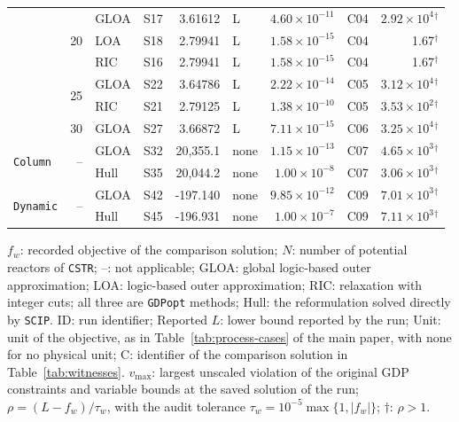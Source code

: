\begin{table}[htbp]
\begin{threeparttable}
\begin{tabular}{@{}lrllrlrlr@{}}
\addlinespace[2pt]
 & \multirow{3}{*}{20} & GLOA & S17 & 3.61612 & L & \(4.60\times10^{-11}\) & C04 & \(2.92\times10^{4}\)\(^{\dagger}\) \\
 & & LOA & S18 & 2.79941 & L & \(1.58\times10^{-15}\) & C04 & 1.67\(^{\dagger}\) \\
 & & RIC & S16 & 2.79941 & L & \(1.58\times10^{-15}\) & C04 & 1.67\(^{\dagger}\) \\
\addlinespace[2pt]
 & \multirow{2}{*}{25} & GLOA & S22 & 3.64786 & L & \(2.22\times10^{-14}\) & C05 & \(3.12\times10^{4}\)\(^{\dagger}\) \\
 & & RIC & S21 & 2.79125 & L & \(1.38\times10^{-10}\) & C05 & \(3.53\times10^{2}\)\(^{\dagger}\) \\
\addlinespace[2pt]
 & 30 & GLOA & S27 & 3.66872 & L & \(7.11\times10^{-15}\) & C06 & \(3.25\times10^{4}\)\(^{\dagger}\) \\
\midrule
\multirow{2}{*}{\texttt{Column}} & \multirow{2}{*}{--} & GLOA & S32 & 20{,}355.1 & none & \(1.15\times10^{-13}\) & C07 & \(4.65\times10^{3}\)\(^{\dagger}\) \\
 & & Hull & S35 & 20{,}044.2 & none & \(1.00\times10^{-8}\) & C07 & \(3.06\times10^{3}\)\(^{\dagger}\) \\
\midrule
\multirow{2}{*}{\texttt{Dynamic}} & \multirow{2}{*}{--} & GLOA & S42 & -197.140 & none & \(9.85\times10^{-12}\) & C09 & \(7.01\times10^{3}\)\(^{\dagger}\) \\
 & & Hull & S45 & -196.931 & none & \(1.00\times10^{-7}\) & C09 & \(7.11\times10^{3}\)\(^{\dagger}\) \\
\bottomrule
\end{tabular}
\begin{tablenotes}[flushleft]\footnotesize
\item \(f_w\): recorded objective of the comparison solution; \(N\): number of potential reactors of \texttt{CSTR}; --: not applicable; GLOA: global logic-based outer approximation; LOA: logic-based outer approximation; RIC: relaxation with integer cuts; all three are \texttt{GDPopt} methods; Hull: the reformulation solved directly by \texttt{SCIP}.
ID: run identifier; Reported \(L\): lower bound reported by the run; Unit: unit of the objective, as in Table~\ifdefined\manuscriptwithsupplement\ref{tab:process-cases}\fi{} of the main paper, with none for no physical unit; C: identifier of the comparison solution in Table~\ref{tab:witnesses}.
\(v_{\max}\): largest unscaled violation of the original GDP constraints and variable bounds at the saved solution of the run; \(\rho=(L-f_w)/\tau_w\), with the audit tolerance \(\tau_w=10^{-5}\max\{1,|f_w|\}\); \(\dagger\): \(\rho>1\).
\end{tablenotes}
\end{threeparttable}
\end{table}
